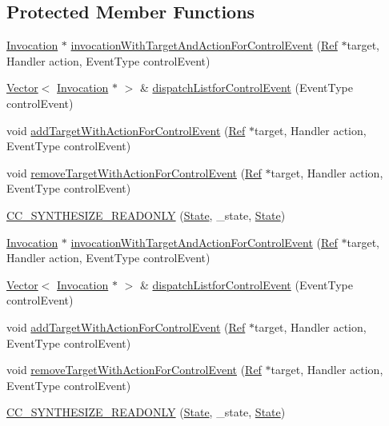 \subsection*{Protected Member Functions}
\begin{DoxyCompactItemize}
\item 
\hyperlink{classInvocation}{Invocation} $\ast$ \hyperlink{classControl_ae35212919d503228bb80a704d889f58d}{invocation\+With\+Target\+And\+Action\+For\+Control\+Event} (\hyperlink{classRef}{Ref} $\ast$target, Handler action, Event\+Type control\+Event)
\item 
\hyperlink{classVector}{Vector}$<$ \hyperlink{classInvocation}{Invocation} $\ast$ $>$ \& \hyperlink{classControl_a95705570ef1f7fe00be96c0fe213fb6e}{dispatch\+Listfor\+Control\+Event} (Event\+Type control\+Event)
\item 
void \hyperlink{classControl_a4a9e5a69a7797b8bb92e1287418952cc}{add\+Target\+With\+Action\+For\+Control\+Event} (\hyperlink{classRef}{Ref} $\ast$target, Handler action, Event\+Type control\+Event)
\item 
void \hyperlink{classControl_a6ec4c2094027c0039a7b6b0f42a2fa7a}{remove\+Target\+With\+Action\+For\+Control\+Event} (\hyperlink{classRef}{Ref} $\ast$target, Handler action, Event\+Type control\+Event)
\item 
\hyperlink{classControl_a1a982733d5a0a9c39e3d6e7b64a188f4}{C\+C\+\_\+\+S\+Y\+N\+T\+H\+E\+S\+I\+Z\+E\+\_\+\+R\+E\+A\+D\+O\+N\+LY} (\hyperlink{classControl_a89e9598cd785841ac91cff3c4798c469}{State}, \+\_\+state, \hyperlink{classControl_a89e9598cd785841ac91cff3c4798c469}{State})
\item 
\hyperlink{classInvocation}{Invocation} $\ast$ \hyperlink{classControl_ae35212919d503228bb80a704d889f58d}{invocation\+With\+Target\+And\+Action\+For\+Control\+Event} (\hyperlink{classRef}{Ref} $\ast$target, Handler action, Event\+Type control\+Event)
\item 
\hyperlink{classVector}{Vector}$<$ \hyperlink{classInvocation}{Invocation} $\ast$ $>$ \& \hyperlink{classControl_af4f74a6a0db957e71a1718aa8513c2ae}{dispatch\+Listfor\+Control\+Event} (Event\+Type control\+Event)
\item 
void \hyperlink{classControl_a4a9e5a69a7797b8bb92e1287418952cc}{add\+Target\+With\+Action\+For\+Control\+Event} (\hyperlink{classRef}{Ref} $\ast$target, Handler action, Event\+Type control\+Event)
\item 
void \hyperlink{classControl_a6ec4c2094027c0039a7b6b0f42a2fa7a}{remove\+Target\+With\+Action\+For\+Control\+Event} (\hyperlink{classRef}{Ref} $\ast$target, Handler action, Event\+Type control\+Event)
\item 
\hyperlink{classControl_a1a982733d5a0a9c39e3d6e7b64a188f4}{C\+C\+\_\+\+S\+Y\+N\+T\+H\+E\+S\+I\+Z\+E\+\_\+\+R\+E\+A\+D\+O\+N\+LY} (\hyperlink{classControl_a89e9598cd785841ac91cff3c4798c469}{State}, \+\_\+state, \hyperlink{classControl_a89e9598cd785841ac91cff3c4798c469}{State})
\end{DoxyCompactItemize}
